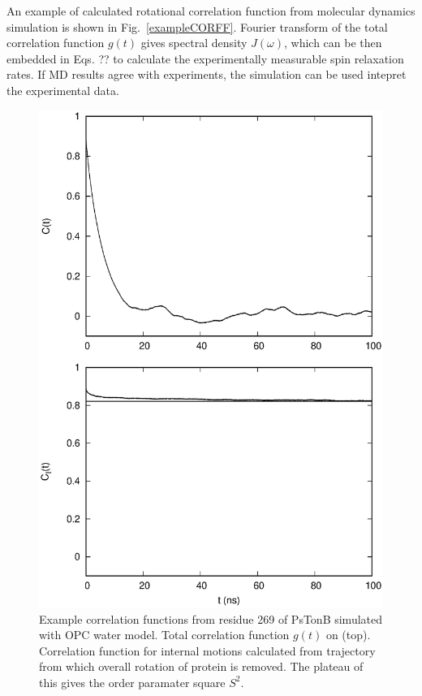 \documentclass[pre,aps,floatfix,authordate1-4]{revtex4-1}
\begin{document}
An example of calculated rotational correlation function from
molecular dynamics simulation is shown in Fig.~\ref{exampleCORFF}.
Fourier transform of the total correlation function $g(t)$ gives
spectral density $J(\omega)$, which can be then embedded in Eqs. ??
to calculate the experimentally measurable spin relaxation rates.
If MD results agree with experiments, the simulation can be used
intepret the experimental data.
\begin{figure}[!h]
  \includegraphics[width=13cm]{../Figs/exampleCORRF.eps}%
  \caption{Example correlation functions from residue 269 of PsTonB simulated with OPC water model.
    Total correlation function $g(t)$ on (top). Correlation function for internal motions
    calculated from trajectory from which overall rotation of protein is removed.
    The plateau of this gives the order paramater square $S^2$.
    \label{exampleCORRF}}%
\end{figure}
\end{document}
